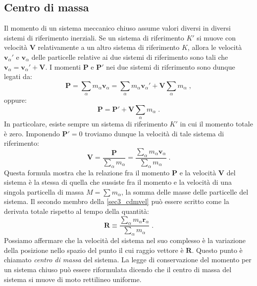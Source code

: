 \subsection{Centro di massa}
Il momento di un sistema meccanico chiuso assume valori diversi in diversi sistemi di riferimento inerziali. Se un sistema di riferimento $K'$ si muove con velocità $\mathbf{V}$ relativamente a un altro sistema di riferimento $K$, allora le velocità $\mathbf{v}_{\alpha}'$ e $\mathbf{v}_{\alpha}$ delle particelle relative ai due sistemi di riferimento sono tali che $\mathbf{v}_{\alpha}=\mathbf{v}_{\alpha}'+\mathbf{V}$. I momenti $\mathbf{P}$ e $\mathbf{P}'$ nei due sistemi di riferimento sono dunque legati da:
\begin{equation}
\mathbf{P}=\sum_{\alpha} m_{\alpha}\mathbf{v}_{\alpha}=\sum_{\alpha}m_{\alpha}\mathbf{v}_{\alpha}'+\mathbf{V}\sum_{\alpha}m_{\alpha}\;,
\end{equation}
oppure:
\begin{equation}
\mathbf{P}=\mathbf{P}'+\mathbf{V}\sum_{\alpha}m_{\alpha}\;.
\end{equation}
In particolare, esiste sempre un sistema di riferimento $K'$ in cui il momento totale è zero. Imponendo $\mathbf{P}'=0$ troviamo dunque la velocità di tale sistema di riferimento:
\begin{equation}
\mathbf{V}=\frac{\mathbf{P}}{\sum_{\alpha}m_{\alpha}}=\frac{\sum_{\alpha}m_{\alpha}\mathbf{v}_{\alpha}}{\sum_{\alpha}m_{\alpha}}\;. \label{sec3_cdmvel}
\end{equation}
Questa formula mostra che la relazione fra il momento $\mathbf{P}$ e la velocità $\mathbf{V}$ del sistema è la stessa di quella che sussiste fra il momento e la velocità di una singola particella di massa $M=\sum m_{\alpha}$, la somma delle masse delle particelle del sistema. Il secondo membro della \eqref{sec3_cdmvel} può essere scritto come la derivata totale rispetto al tempo della quantità:
\begin{equation}
\mathbf{R}\equiv \frac{\sum_{\alpha} m_{\alpha}\mathbf{r}_{\alpha}}{\sum_{\alpha} m_{\alpha}}\;.
\end{equation}
Possiamo affermare che la velocità del sistema nel suo complesso è la variazione della posizione nello spazio del punto il cui raggio vettore è $\mathbf{R}$. Questo punto è chiamato \textit{centro di massa} del sistema. La legge di conservazione del momento per un sistema chiuso può essere riformulata dicendo che il centro di massa del sistema si muove di moto rettilineo uniforme. \\

